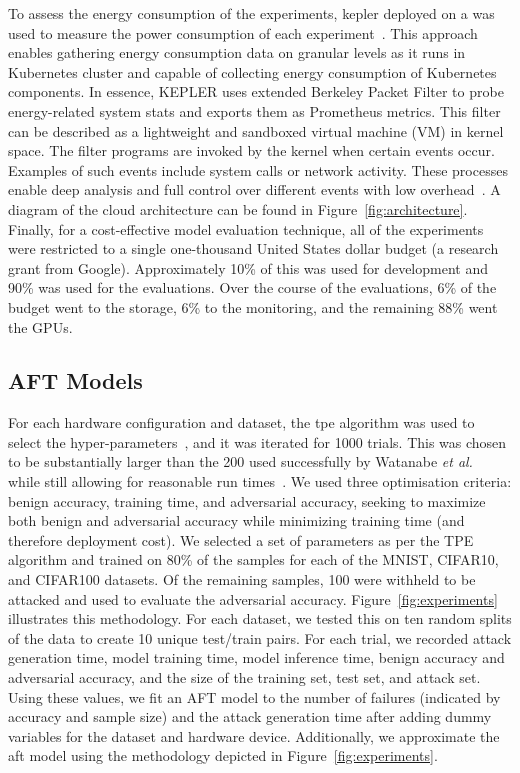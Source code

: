 \documentclass[sn-mathphys-num]{sn-jnl}%
\begin{document}
To assess the energy consumption of the experiments, \Gls{kepler} deployed on a was used to measure the power consumption of each experiment~\cite{amaral2023kepler}. This approach enables gathering energy consumption data on granular levels as it runs in Kubernetes cluster and capable of collecting energy consumption of Kubernetes components. In essence, KEPLER uses extended Berkeley Packet Filter to probe energy-related system stats and exports them as Prometheus metrics. This filter can be described as a lightweight and sandboxed virtual machine (VM) in kernel space. The filter programs are invoked by the kernel when certain events occur. Examples of such events include system calls or network activity. These processes enable deep analysis and full control over different events with low overhead~\cite{sedghpour@ebpf}. A diagram of the cloud architecture can be found in Figure~\ref{fig:architecture}. Finally, for a cost-effective model evaluation technique, all of the experiments were restricted to a single one-thousand United States dollar budget (a research grant from Google). Approximately 10\% of this was used for development and 90\% was used for the evaluations.
Over the course of the evaluations, 6\% of the budget went to the storage, 6\% to the monitoring, and the remaining 88\% went the GPUs.



\subsection{AFT Models}

For each hardware configuration and dataset, the \acrshort{tpe} algorithm was used to select the hyper-parameters~\cite{ozaki2020multiobjective,zitzler2008quality}, and it was iterated for 1000 trials. This was chosen to be substantially larger than the 200 used successfully by Watanabe \textit{et al.}~\cite{tpe_params} while still allowing for reasonable run times~\cite{legriel2010approximating}. 
We used three optimisation criteria: benign accuracy, training time, and adversarial accuracy, seeking to maximize both benign and adversarial accuracy while minimizing training time (and therefore deployment cost). We selected a set of parameters as per the TPE algorithm and trained on 80\% of the samples for each of the MNIST, CIFAR10, and CIFAR100 datasets. Of the remaining samples, 100 were withheld to be attacked and used to evaluate the adversarial accuracy. Figure~\ref{fig:experiments} illustrates this methodology. For each dataset, we tested this on ten random splits of the data to create 10 unique test/train pairs. For each trial, we recorded attack generation time, model training time, model inference time, benign accuracy and adversarial accuracy, and the size of the training set, test set, and attack set. Using these values, we fit an AFT model to the number of failures (indicated by accuracy and sample size) and the attack generation time after adding dummy variables for the dataset and hardware device. Additionally, we approximate the \acrshort{aft} model using the methodology depicted in Figure~\ref{fig:experiments}.
\end{document}
